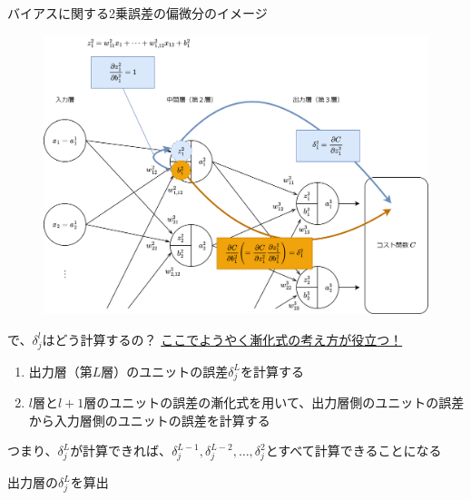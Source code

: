 \documentclass[dvipdfmx,aspectratio=169]{beamer}
\begin{document}
	\begin{frame}{バイアスに関する2乗誤差の偏微分のイメージ}
		\begin{figure}
			\centering
			\includegraphics[width=0.7\linewidth]{img/image-of-the-partial-derivative-of-the-squared-error-with-respect-to-the-bias}
		\end{figure}
	\end{frame}
	\begin{frame}{で、$ \delta^l_j $はどう計算するの？}
		\underline{ここでようやく\alert{漸化式}の考え方が役立つ！}
		\begin{enumerate}
			\item 出力層（第$ L $層）のユニットの誤差$ \delta^L_j $を計算する
			\item $ l $層と$ l+1 $層のユニットの誤差の漸化式を用いて、出力層側のユニットの誤差から入力層側のユニットの誤差を計算する
		\end{enumerate}
		つまり、$ \delta^L_j $が計算できれば、$ \delta^{L-1}_j, \delta^{L-2}_j,\dots, \delta^2_j $とすべて計算できることになる
	\end{frame}
	\begin{frame}{出力層の$ \delta^L_j $を算出}
		
	\end{frame}
\end{document}
